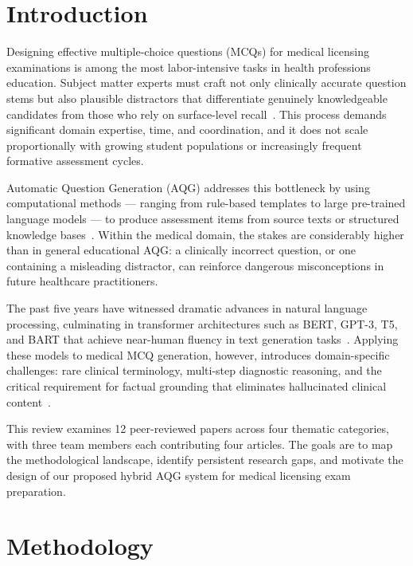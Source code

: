 \documentclass[conference]{IEEEtran}
\begin{document}
\section{Introduction}

Designing effective multiple-choice questions (MCQs) for medical licensing examinations is among the most labor-intensive tasks in health professions education. Subject matter experts must craft not only clinically accurate question stems but also plausible distractors that differentiate genuinely knowledgeable candidates from those who rely on surface-level recall~\cite{leo2019ontology}. This process demands significant domain expertise, time, and coordination, and it does not scale proportionally with growing student populations or increasingly frequent formative assessment cycles.

Automatic Question Generation (AQG) addresses this bottleneck by using computational methods — ranging from rule-based templates to large pre-trained language models — to produce assessment items from source texts or structured knowledge bases~\cite{kurdi2020systematic}. Within the medical domain, the stakes are considerably higher than in general educational AQG: a clinically incorrect question, or one containing a misleading distractor, can reinforce dangerous misconceptions in future healthcare practitioners.

The past five years have witnessed dramatic advances in natural language processing, culminating in transformer architectures such as BERT, GPT-3, T5, and BART that achieve near-human fluency in text generation tasks~\cite{ghanem2022medical,wang2022towards}. Applying these models to medical MCQ generation, however, introduces domain-specific challenges: rare clinical terminology, multi-step diagnostic reasoning, and the critical requirement for factual grounding that eliminates hallucinated clinical content~\cite{steuer2021mcq,saha2023llm}.

This review examines 12 peer-reviewed papers across four thematic categories, with three team members each contributing four articles. The goals are to map the methodological landscape, identify persistent research gaps, and motivate the design of our proposed hybrid AQG system for medical licensing exam preparation.

\section{Methodology}
\end{document}

